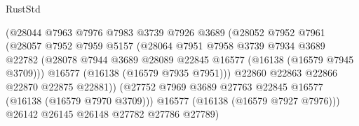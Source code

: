 \begin{lexlean}{RustStd}
\begin{coremodule}
                                      (@28044
                                        @7963
                                        @7976
                                        @7983
                                        @3739
                                        @7926
                                        @3689
                                        (@28052
                                          @7952
                                          @7961
                                          (@28057
                                            @7952
                                            @7959
                                            @5157
                                            (@28064
                                              @7951
                                              @7958
                                              @3739
                                              @7934
                                              @3689
                                              @22782
                                              (@28078
                                                @7944
                                                @3689
                                                @28089
                                                @22845
                                                @16577
                                                (@16138 (@16579 @7945 @3709)))
                                              @16577
                                              (@16138 (@16579 @7935 @7951)))
                                            @22860
                                            @22863
                                            @22866
                                            @22870
                                            @22875
                                            @22881))
                                        (@27752
                                          @7969
                                          @3689
                                          @27763
                                          @22845
                                          @16577
                                          (@16138 (@16579 @7970 @3709)))
                                        @16577
                                        (@16138 (@16579 @7927 @7976)))
                                      @26142
                                      @26145
                                      @26148
                                      @27782
                                      @27786
                                      @27789)

\end{coremodule}
\end{lexlean}
